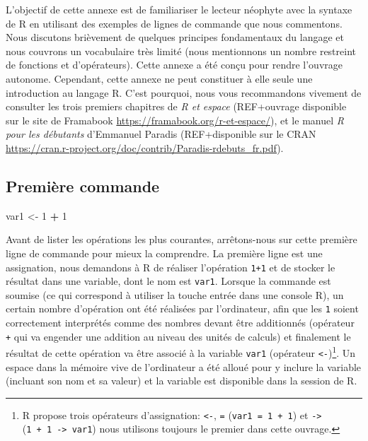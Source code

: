 \documentclass[]{article}
\newenvironment{Shaded}{\begin{snugshade}}{\end{snugshade}}
\newcommand{\DecValTok}[1]{\textcolor[rgb]{0.00,0.00,0.81}{#1}}
\newcommand{\NormalTok}[1]{#1}
\newcommand{\OperatorTok}[1]{\textcolor[rgb]{0.81,0.36,0.00}{\textbf{#1}}}
\newcommand{\StringTok}[1]{\textcolor[rgb]{0.31,0.60,0.02}{#1}}
\begin{document}
L'objectif de cette annexe est de familiariser le lecteur néophyte avec la
syntaxe de R en utilisant des exemples de lignes de commande que nous
commentons. Nous discutons brièvement de quelques principes fondamentaux du
langage et nous couvrons un vocabulaire très limité (nous mentionnons un nombre
restreint de fonctions et d'opérateurs). Cette annexe a été conçu pour rendre
l'ouvrage autonome. Cependant, cette annexe ne peut constituer à elle seule une
introduction au langage R. C'est pourquoi, nous vous recommandons vivement de
consulter les trois premiers chapitres de \emph{R et espace} (REF+ouvrage disponible
sur le site de Framabook \url{https://framabook.org/r-et-espace/}), et le manuel \emph{R
pour les débutants} d'Emmanuel Paradis (REF+disponible sur le CRAN
\url{https://cran.r-project.org/doc/contrib/Paradis-rdebuts_fr.pdf}).

\hypertarget{premiuxe8re-commande}{%
\subsection*{Première commande}\label{premiuxe8re-commande}}

\begin{Shaded}
\begin{Highlighting}[]
\NormalTok{var1 <-}\StringTok{ }\DecValTok{1} \OperatorTok{+}\StringTok{ }\DecValTok{1}
\end{Highlighting}
\end{Shaded}

Avant de lister les opérations les plus courantes, arrêtons-nous sur cette
première ligne de commande pour mieux la comprendre. La première ligne est une
assignation, nous demandons à R de réaliser l'opération \texttt{1+1} et de stocker le
résultat dans une variable, dont le nom est \texttt{var1}. Lorsque la commande est
soumise (ce qui correspond à utiliser la touche entrée dans une console R), un
certain nombre d'opération ont été réalisées par l'ordinateur, afin que les
\texttt{1} soient correctement interprétés comme des nombres devant être additionnés
(opérateur \texttt{+} qui va engender une addition au niveau des unités de calculs)
et finalement le résultat de cette opération va être associé à la variable
\texttt{var1} (opérateur \texttt{\textless{}-})\footnote{R propose trois opérateurs d'assignation: \texttt{\textless{}-}, \texttt{=} (\texttt{var1\ =\ 1\ +\ 1})
  et \texttt{-\textgreater{}} (\texttt{1\ +\ 1\ -\textgreater{}\ var1}) nous utilisons toujours le premier dans cette ouvrage.}. Un espace dans la mémoire vive de l'ordinateur
a été alloué pour y inclure la variable (incluant son nom et sa valeur) et la
variable est disponible dans la session de R.
\end{document}
